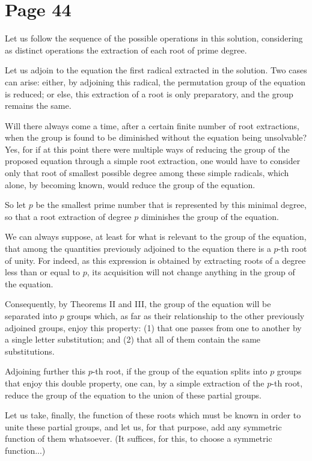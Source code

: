 \documentclass{article}
\begin{document}
\section*{Page 44}

Let us follow the sequence of the possible operations in this solution, considering as distinct operations the extraction of each root of prime degree.

Let us adjoin to the equation the first radical extracted in the solution. Two cases can arise: either, by adjoining this radical, the permutation group of the equation is reduced; or else, this extraction of a root is only preparatory, and the group remains the same.

Will there always come a time, after a certain finite number of root extractions, when the group is found to be diminished without the equation being unsolvable? Yes, for if at this point there were multiple ways of reducing the group of the proposed equation through a simple root extraction, one would have to consider only that root of smallest possible degree among these simple radicals, which alone, by becoming known, would reduce the group of the equation.

So let $p$ be the smallest prime number that is represented by this minimal degree, so that a root extraction of degree $p$ diminishes the group of the equation.

We can always suppose, at least for what is relevant to the group of the equation, that among the quantities previously adjoined to the equation there is a $p$-th root of unity. For indeed, as this expression is obtained by extracting roots of a degree less than or equal to $p$, its acquisition will not change anything in the group of the equation.

Consequently, by Theorems II and III, the group of the equation will be separated into $p$ groups which, as far as their relationship to the other previously adjoined groups, enjoy this property: (1) that one passes from one to another by a single letter substitution; and (2) that all of them contain the same substitutions.

Adjoining further this $p$-th root, if the group of the equation splits into $p$ groups that enjoy this double property, one can, by a simple extraction of the $p$-th root, reduce the group of the equation to the union of these partial groups.

Let us take, finally, the function of these roots which must be known in order to unite these partial groups, and let us, for that purpose, add any symmetric function of them whatsoever. (It suffices, for this, to choose a symmetric function...) 
\end{document}

